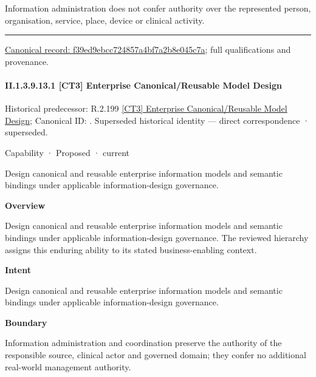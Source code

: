 Information administration does not confer authority over the represented person, organisation, service, place, device or clinical activity.



\medskip\hrule\medskip

{\footnotesize \href{../../../../../../../continuum/strategy/capability/f39ed9ebcc724857a4bf7a2b8e045c7a.md}{Canonical record: f39ed9ebcc724857a4bf7a2b8e045c7a}; full qualifications and provenance.}\par
\paragraph*{II.1.3.9.13.1 [CT3] Enterprise Canonical/Reusable Model Design}
\label{navigation:II.1.3.9.13.1}

{\small Historical predecessor: R.2.199 \hyperref[element:dbc37445ad944a85a7c4f26f410967b2]{[CT3] Enterprise Canonical/Reusable Model Design}; Canonical ID: \texttt{}. Superseded historical identity — direct correspondence · superseded.}\par
\label{element:90e9cd401ddf4c7690c978d8dd131413}
{\small Capability · Proposed · current}\par

Design canonical and reusable enterprise information models and semantic bindings under applicable information-design governance.



\textbf{Overview}



Design canonical and reusable enterprise information models and semantic bindings under applicable information-design governance. The reviewed hierarchy assigns this enduring ability to its stated business-enabling context.



\textbf{Intent}



Design canonical and reusable enterprise information models and semantic bindings under applicable information-design governance.



\textbf{Boundary}



Information administration and coordination preserve the authority of the responsible source, clinical actor and governed domain; they confer no additional real-world management authority.


